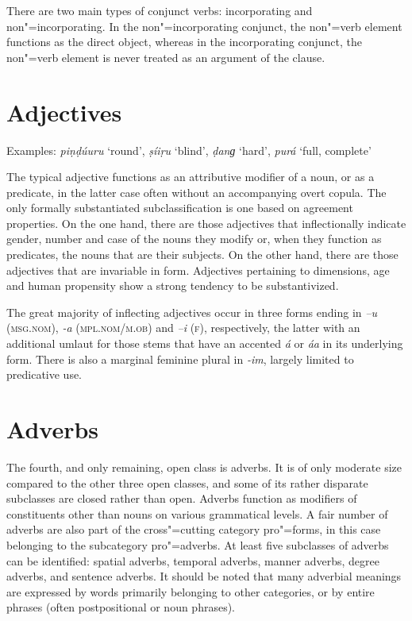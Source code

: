 There are two main types of conjunct verbs: incorporating and non"=incorporating. In the non"=incorporating conjunct, the non"=verb element functions as the direct object, whereas in the incorporating conjunct, the non"=verb element is never treated as an argument of the clause.


\section{Adjectives}
\label{sec:3b-4}
Examples: \textit{piṇḍúuru} `round', \textit{ṣíiṛu} `blind', \textit{ḍanɡ} `hard', \textit{purá} `full, complete'


The typical adjective functions as an attributive modifier of a noun, or as a predicate, in the latter case often without an accompanying overt copula. The only formally substantiated subclassification is one based on agreement properties. On the one hand, there are those adjectives that inflectionally indicate gender, number and case of the nouns they modify or, when they function as predicates, the nouns that are their subjects. On the other hand, there are those adjectives that are invariable in form. Adjectives pertaining to dimensions, age and human propensity show a strong tendency to be substantivized.


The great majority of inflecting adjectives occur in three forms ending in \textit{–u} (\textsc{msg.nom}),  \textit{-a} (\textsc{mpl.nom/m.ob}) and \textit{–i} (\textsc{f}), respectively, the latter with an additional umlaut for those stems that have an accented \textit{á} or \textit{áa} in its underlying form. There is also a marginal feminine plural in \textit{-im}, largely limited to predicative use.  


\section{Adverbs}
\label{sec:3b-5}
The fourth, and only remaining, open class is adverbs. It is of only moderate size compared to the other three open classes, and some of its rather disparate subclasses are closed rather than open. Adverbs function as modifiers of constituents other than nouns on various grammatical levels. A fair number of adverbs are also part of the cross"=cutting category pro"=forms, in this case belonging to the subcategory pro"=adverbs. At least five subclasses of adverbs can be identified: spatial adverbs, temporal adverbs, manner adverbs, degree adverbs, and sentence adverbs. It should be noted that many adverbial meanings are expressed by words primarily belonging to other categories, or by entire phrases (often postpositional or noun phrases).



